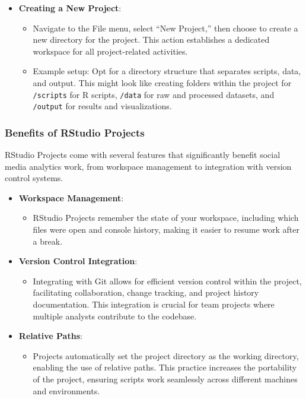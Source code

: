\documentclass[
]{book}
\providecommand{\tightlist}{%
  \setlength{\itemsep}{0pt}\setlength{\parskip}{0pt}}
\begin{document}
\begin{itemize}
\tightlist
\item
  \textbf{Creating a New Project}:

  \begin{itemize}
  \tightlist
  \item
    Navigate to the File menu, select ``New Project,'' then choose to create a new directory for the project. This action establishes a dedicated workspace for all project-related activities.
  \item
    Example setup: Opt for a directory structure that separates scripts, data, and output. This might look like creating folders within the project for \texttt{/scripts} for R scripts, \texttt{/data} for raw and processed datasets, and \texttt{/output} for results and visualizations.
  \end{itemize}
\end{itemize}

\hypertarget{benefits-of-rstudio-projects}{%
\subsubsection{Benefits of RStudio Projects}\label{benefits-of-rstudio-projects}}

RStudio Projects come with several features that significantly benefit social media analytics work, from workspace management to integration with version control systems.

\begin{itemize}
\tightlist
\item
  \textbf{Workspace Management}:

  \begin{itemize}
  \tightlist
  \item
    RStudio Projects remember the state of your workspace, including which files were open and console history, making it easier to resume work after a break.
  \end{itemize}
\item
  \textbf{Version Control Integration}:

  \begin{itemize}
  \tightlist
  \item
    Integrating with Git allows for efficient version control within the project, facilitating collaboration, change tracking, and project history documentation. This integration is crucial for team projects where multiple analysts contribute to the codebase.
  \end{itemize}
\item
  \textbf{Relative Paths}:

  \begin{itemize}
  \tightlist
  \item
    Projects automatically set the project directory as the working directory, enabling the use of relative paths. This practice increases the portability of the project, ensuring scripts work seamlessly across different machines and environments.
  \end{itemize}
\end{itemize}
\end{document}
